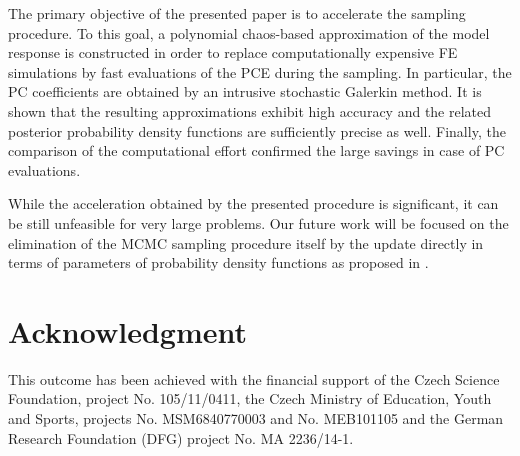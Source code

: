 \documentclass[preprint,12pt]{elsarticle}
\begin{document}
The primary objective of the presented paper is to accelerate the
sampling procedure. To this goal, a polynomial chaos-based
approximation of the model response is constructed in order to
replace computationally expensive FE simulations by fast
evaluations of the PCE during the sampling. In particular, the PC
coefficients are obtained by an intrusive stochastic Galerkin
method. It is shown that the resulting approximations exhibit high
accuracy and the related posterior probability density functions
are sufficiently precise as well. Finally, the comparison of the
computational effort confirmed the large savings in case of PC
evaluations.

While the acceleration obtained by the presented procedure is
significant, it can be still unfeasible for very large problems.
Our future work will be focused on the elimination of the MCMC
sampling procedure itself by the update directly in terms of
parameters of probability density functions as proposed in
\cite{Rosic:2011:JCP}.

\section*{Acknowledgment}
This outcome has been achieved with the financial support of the
Czech Science Foundation, project No. 105/11/0411, the Czech
Ministry of Education, Youth and Sports, projects No.
MSM6840770003 and No. MEB101105 and the German Research Foundation
(DFG) project No. MA 2236/14-1.



\end{document}
